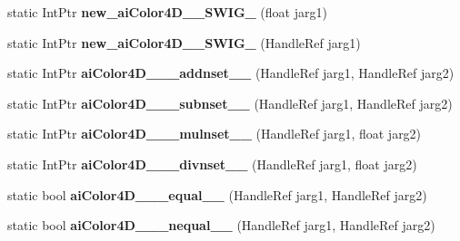 \begin{DoxyCompactItemize}
\item 
\hypertarget{class_assimp_p_i_n_v_o_k_e_a9f241cef4c1e4a6071c908cebf489eee}{static Int\+Ptr {\bfseries new\+\_\+ai\+Color4\+D\+\_\+\+\_\+\+S\+W\+I\+G\+\_} (float jarg1)}\label{class_assimp_p_i_n_v_o_k_e_a9f241cef4c1e4a6071c908cebf489eee}

\item 
\hypertarget{class_assimp_p_i_n_v_o_k_e_a42dde902113d8512b514351bdb218dbe}{static Int\+Ptr {\bfseries new\+\_\+ai\+Color4\+D\+\_\+\+\_\+\+S\+W\+I\+G\+\_} (Handle\+Ref jarg1)}\label{class_assimp_p_i_n_v_o_k_e_a42dde902113d8512b514351bdb218dbe}

\item 
\hypertarget{class_assimp_p_i_n_v_o_k_e_a12a82f1521d2f0b08a2123eaaab0b728}{static Int\+Ptr {\bfseries ai\+Color4\+D\+\_\+\+\_\+\+\_\+addnset\+\_\+\+\_\+} (Handle\+Ref jarg1, Handle\+Ref jarg2)}\label{class_assimp_p_i_n_v_o_k_e_a12a82f1521d2f0b08a2123eaaab0b728}

\item 
\hypertarget{class_assimp_p_i_n_v_o_k_e_a92d056a39e1788eea8850a685315bc55}{static Int\+Ptr {\bfseries ai\+Color4\+D\+\_\+\+\_\+\+\_\+subnset\+\_\+\+\_\+} (Handle\+Ref jarg1, Handle\+Ref jarg2)}\label{class_assimp_p_i_n_v_o_k_e_a92d056a39e1788eea8850a685315bc55}

\item 
\hypertarget{class_assimp_p_i_n_v_o_k_e_adef84181617599968191b9cbb5ef6216}{static Int\+Ptr {\bfseries ai\+Color4\+D\+\_\+\+\_\+\+\_\+mulnset\+\_\+\+\_\+} (Handle\+Ref jarg1, float jarg2)}\label{class_assimp_p_i_n_v_o_k_e_adef84181617599968191b9cbb5ef6216}

\item 
\hypertarget{class_assimp_p_i_n_v_o_k_e_a37c851032b858a5e2b4252f6eea66815}{static Int\+Ptr {\bfseries ai\+Color4\+D\+\_\+\+\_\+\+\_\+divnset\+\_\+\+\_\+} (Handle\+Ref jarg1, float jarg2)}\label{class_assimp_p_i_n_v_o_k_e_a37c851032b858a5e2b4252f6eea66815}

\item 
\hypertarget{class_assimp_p_i_n_v_o_k_e_a8d1e5274e733d84533cd6ebdbfe1898a}{static bool {\bfseries ai\+Color4\+D\+\_\+\+\_\+\+\_\+equal\+\_\+\+\_\+} (Handle\+Ref jarg1, Handle\+Ref jarg2)}\label{class_assimp_p_i_n_v_o_k_e_a8d1e5274e733d84533cd6ebdbfe1898a}

\item 
\hypertarget{class_assimp_p_i_n_v_o_k_e_ad22cb2e377ee293d5422b708a1d15e57}{static bool {\bfseries ai\+Color4\+D\+\_\+\+\_\+\+\_\+nequal\+\_\+\+\_\+} (Handle\+Ref jarg1, Handle\+Ref jarg2)}\label{class_assimp_p_i_n_v_o_k_e_ad22cb2e377ee293d5422b708a1d15e57}


\end{DoxyCompactItemize}
